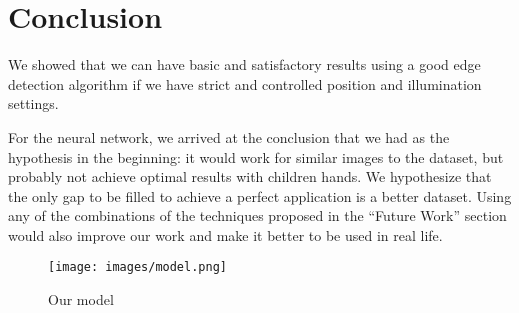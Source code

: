 \documentclass[conference]{IEEEtran}
\begin{document}
\section{Conclusion}
We showed that we can have basic and satisfactory results using a good edge detection algorithm if we have strict and controlled position and illumination settings.

For the neural network, we arrived at the conclusion that we had as the hypothesis in the beginning: it would work for similar images to the dataset, but probably not achieve optimal results with children hands. We hypothesize that the only gap to be filled to achieve a perfect application is a better dataset. Using any of the combinations of the techniques proposed in the ``Future Work'' section would also improve our work and make it better to be used in real life.


\begin{figure*}
\centerline{\texttt{[image: images/model.png]}}
\caption{Our model}
\label{model}
\end{figure*}
\end{document}
